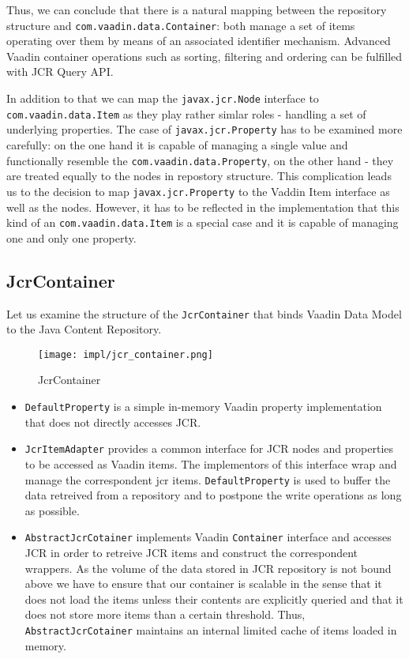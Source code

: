 Thus, we can conclude that there is a natural mapping between the repository
structure and \texttt{com.vaadin.data.Container}: both manage a set of items
operating over them by means of an associated identifier mechanism. Advanced
Vaadin container operations such as sorting, filtering and ordering can be
fulfilled with JCR Query API.

In addition to that we can map the \texttt{javax.jcr.Node} interface to
\texttt{com.vaadin.data.Item} as they play rather simlar roles - handling a set
of underlying properties. The case of \texttt{javax.jcr.Property} has to be
examined more carefully: on the one hand it is capable of managing a single
value and functionally resemble the \texttt{com.vaadin.data.Property}, on the
other hand - they are treated equally to the nodes in repostory structure. This
complication leads us to the decision to map \texttt{javax.jcr.Property} to the
Vaddin Item interface as well as the nodes. However, it has to be reflected in
the implementation that this kind of an \texttt{com.vaadin.data.Item} is a
special case and it is capable of managing one and only one property. 

\subsection{JcrContainer}
Let us examine the structure of the \texttt{JcrContainer} that binds Vaadin Data Model to the 
Java Content Repository.

\begin{figure}[H]
	\centering
	\texttt{[image: impl/jcr\_container.png]}
	\caption{JcrContainer}
	\label{fig:jcr_container}
\end{figure}

\begin{itemize}
  \item \texttt{DefaultProperty} is a simple in-memory Vaadin property
  implementation that does not directly accesses JCR.
  \item \texttt{JcrItemAdapter} provides a common interface for JCR nodes and
  properties to be accessed as Vaadin items. The implementors of this interface
  wrap and manage the correspondent jcr items. \texttt{DefaultProperty} is used to buffer
  the data retreived from a repository and to postpone the write operations as
  long as possible.
  \item \texttt{AbstractJcrCotainer} implements Vaadin \texttt{Container}
  interface and accesses JCR in order to retreive JCR items and construct the
  correspondent wrappers. As the volume of the data stored in JCR repository is
  not bound above we have to ensure that our container is scalable in the
  sense that it does not load the items unless their contents are explicitly
  queried and that it does not store more items than a certain threshold. Thus,
  \texttt{AbstractJcrCotainer} maintains an internal limited cache of items
  loaded in memory.
\end{itemize}
 

